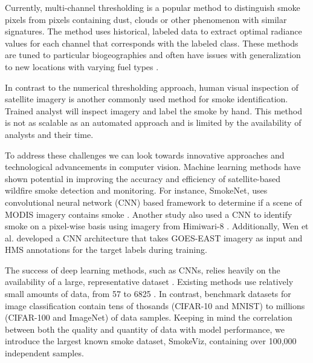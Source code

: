 \documentclass{ametsocV6.1}
\begin{document}
Currently, multi-channel thresholding is a popular method to distinguish smoke pixels from pixels containing dust, clouds or other phenomenon with similar signatures. The method uses historical, labeled data to extract optimal radiance values for each channel that corresponds with the labeled class. These methods are tuned to particular biogeographies and often have issues with generalization to new locations with varying fuel types \citep{thresh_geog}.

In contrast to the numerical thresholding approach, human visual inspection of satellite imagery is another commonly used method for smoke identification. Trained analyst will inspect imagery and label the smoke by hand. This method is not as scalable as an automated approach and is limited by the availability of analysts and their time.


To address these challenges we can look towards innovative approaches and technological advancements in computer vision. Machine learning methods have shown potential in improving the accuracy and efficiency of satellite-based wildfire smoke detection and monitoring. For instance, SmokeNet, uses convolutional neural network (CNN) based framework to determine if a scene of MODIS imagery contains smoke \citep{smokenet}. Another study also used a CNN to identify smoke on a pixel-wise basis
using imagery from Himiwari-8 \citep{larsen}. Additionally, Wen et al. developed a CNN architecture that takes GOES-EAST imagery as input and HMS annotations for the target labels during training\citep{smoke_goes}. 

The success of deep learning methods, such as CNNs, relies heavily on the availability of a large, representative dataset \citep{data_size}. Existing methods use relatively small amounts of data, from 57 \citep{wang} to 6825 \citep{smoke_goes}. In contrast, benchmark datasets for image classification contain tens of thosands (CIFAR-10 and MNIST) to millions (CIFAR-100 and ImageNet) of data samples. Keeping in mind the correlation between both the quality and quantity of data with model performance, we introduce the largest known smoke dataset, SmokeViz, containing over 100,000 independent samples.
\end{document}
